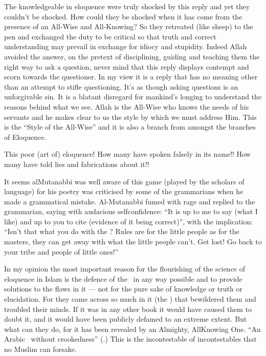 \documentclass[12pt]{memoir}
\begin{document}
The knowledgeable in eloquence were truly shocked by this reply
and yet they couldn’t be shocked.
How could they be shocked when it has come from the presence
of an All-Wise and All-Knowing?
So they retreated (like sheep) to the pen and exchanged the duty to be critical
so that truth and correct understanding may prevail in exchange for idiocy
and stupidity. Indeed Allah avoided the answer, on the pretext of disciplining,
guiding and teaching them the right way to ask a question,
never mind that this reply displays contempt and scorn towards the questioner.
In my view it is a reply that has no meaning other than an attempt
to stifle questioning.
It’s as though asking questions is an unforgivable sin.
It is a blatant disregard for mankind’s longing to understand
the reasons behind what we see.
Allah is the All-Wise who knows the needs of his servants
and he makes clear to us the style by which we must address Him.
This is the “Style of the All-Wise” and it is also a branch
from amongst the branches of Eloquence.

This poor (art of) eloquence!
How many have spoken falsely in its name!!
How many have told lies and fabrications about it!!

It seems al\–Mutanabbi was well aware of this game
(played by the scholars of language)
for his poetry was criticised by some of the grammarians
when he made a grammatical mistake.
Al-Mutanabbi fumed with rage and replied to the grammarian,
saying with audacious self\–confidence:
“It is up to me to say (what I like) and up to you to cite
(evidence of it being correct)”, with the implication:
“Isn’t that what you do with the \Quran?
Rules are for the little people as for the masters,
they can get away with what the little people can’t.
Get lost! Go back to your tribe and people of little ones!”

In my opinion the most important reason for the flourishing of the science
of eloquence in Islam is the defence of the \Quran\ in any way possible
and to provide solutions to the flaws in it —
not for the pure sake of knowledge or truth or elucidation.
For they came across so much in it (the \Quran) that bewildered them
and troubled their minds.
If it was in any other book it would have caused them to doubt it,
and it would have been publicly defamed to an extreme extent.
But what can they do, for it has been revealed by an Almighty, All\–Knowing One.
“An Arabic \Quran\ without crookedness” (.)
This is the incontestable of incontestables that no Muslim can forsake.
\end{document}

